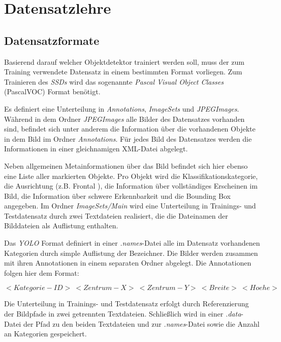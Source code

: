 \section{Datensatzlehre}

\subsection{Datensatzformate}

Basierend darauf welcher Objektdetektor trainiert werden soll, muss der zum Training verwendete Datensatz in einem bestimmten Format vorliegen. Zum Trainieren des \textit{SSDs} wird das sogenannte \textit{Pascal Visual Object Classes} (PascalVOC) Format benötigt. 

Es definiert eine Unterteilung in \textit{Annotations}, \textit{ImageSets} und \textit{JPEGImages}. Während in dem Ordner \textit{JPEGImages} alle Bilder des Datensatzes vorhanden sind, befindet sich unter anderem die Information über die vorhandenen Objekte in dem Bild im Ordner \textit{Annotations}. Für jedes Bild des Datensatzes werden die Informationen in einer gleichnamigen XML-Datei abgelegt. 

\lstset{language=XML}


Neben allgemeinen Metainformationen über das Bild befindet sich hier ebenso eine Liste aller markierten Objekte. Pro Objekt wird die Klassifikationskategorie, die Ausrichtung (z.B. \glqq Frontal \grqq{}), die Information über vollständiges Erscheinen im Bild, die Information über schwere Erkennbarkeit und die Bounding Box angegeben. Im Ordner \textit{ImageSets/Main} wird eine Unterteilung in Trainings- und Testdatensatz durch zwei Textdateien realisiert, die die Dateinamen der Bilddateien als Auflistung enthalten. \cite{RenuKhandelwal.2019}

Das \textit{YOLO} Format definiert in einer \textit{.names}-Datei alle im Datensatz vorhandenen Kategorien durch simple Auflistung der Bezeichner. Die Bilder werden zusammen mit ihren Annotationen in einem separaten Ordner abgelegt. Die Annotationen folgen hier dem Format:

$<Kategorie-ID>\:<Zentrum-X>\:<Zentrum-Y>\:<Breite>\:<Hoehe>$

Die Unterteilung in Trainings- und Testdatensatz erfolgt durch Referenzierung der Bildpfade in zwei getrennten Textdateien. Schließlich wird in einer \textit{.data}-Datei der Pfad zu den beiden Textdateien und zur \textit{.names}-Datei sowie die Anzahl an Kategorien gespeichert. \cite{ArunPonnusamy.20191006}


